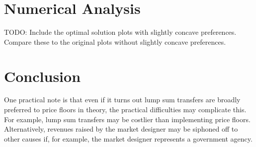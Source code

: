 \documentclass[AER]{AEA}
\begin{document}
\section{Numerical Analysis}

TODO: Include the optimal solution plots with slightly concave preferences. Compare these to the original plots without slightly concave preferences.


\section{Conclusion}

One practical note is that even if it turns out lump sum transfers are broadly preferred to price floors in theory, the practical difficulties may complicate this. For example, lump sum transfers may be costlier than implementing price floors. Alternatively, revenues raised by the market designer may be siphoned off to other causes if, for example, the market designer represents a government agency.

            
        
    


\end{document}
